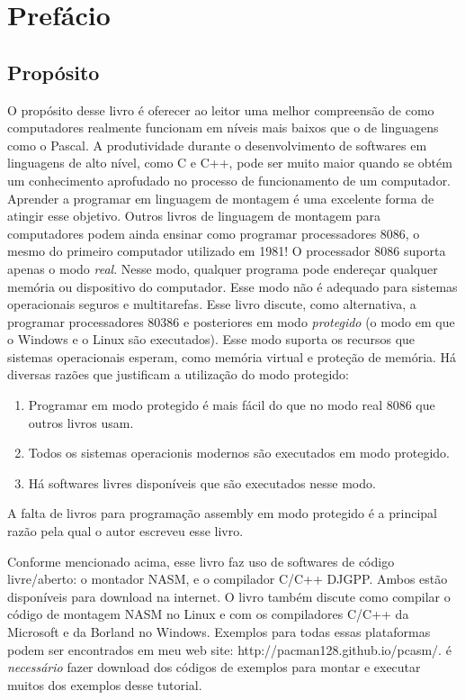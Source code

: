
\chapter{Prefácio}

\section*{Propósito}

O propósito desse livro é oferecer ao leitor uma melhor compreensão
de como computadores realmente funcionam em níveis mais baixos que o de 
linguagens como o Pascal. A produtividade durante o desenvolvimento de
softwares em linguagens de alto nível, como C e C++, pode ser muito maior
quando se obtém um conhecimento aprofudado no processo de funcionamento de um
computador. Aprender a programar em linguagem de montagem é uma excelente forma
de atingir esse objetivo. Outros livros de linguagem de montagem para 
computadores podem ainda ensinar como programar processadores 8086, o mesmo
do primeiro computador utilizado em 1981! O processador 8086 suporta apenas o modo
\emph{real}. Nesse modo, qualquer programa pode endereçar qualquer memória ou
dispositivo do computador. Esse modo não é adequado para sistemas operacionais
seguros e multitarefas. Esse livro discute, como alternativa, a programar 
processadores 80386 e posteriores em modo \emph{protegido} (o modo em que o 
Windows e o Linux são executados). Esse modo suporta os recursos que sistemas 
operacionais esperam, como memória virtual e proteção de memória.
Há diversas razões que justificam a utilização do modo protegido:

\begin{enumerate}
\item Programar em modo protegido é mais fácil do que no modo real 8086
	  que outros livros usam.
\item Todos os sistemas operacionis modernos são executados em modo protegido.
\item Há softwares livres disponíveis que são executados nesse modo.
\end{enumerate}
A falta de livros para programação assembly em modo protegido é a principal
razão pela qual o autor escreveu esse livro.

Conforme mencionado acima, esse livro faz uso de softwares de
código livre/aberto: o montador NASM, e o compilador
C/C++ DJGPP. Ambos estão disponíveis para download na internet. O livro
também discute como compilar o código de montagem NASM no Linux e com os
compiladores C/C++ da Microsoft e da Borland no Windows. Exemplos para todas
essas plataformas podem ser encontrados em meu web site:
{\code http://pacman128.github.io/pcasm/}.
é \emph{necessário} fazer download dos códigos de exemplos para montar e
executar muitos dos exemplos desse tutorial.

